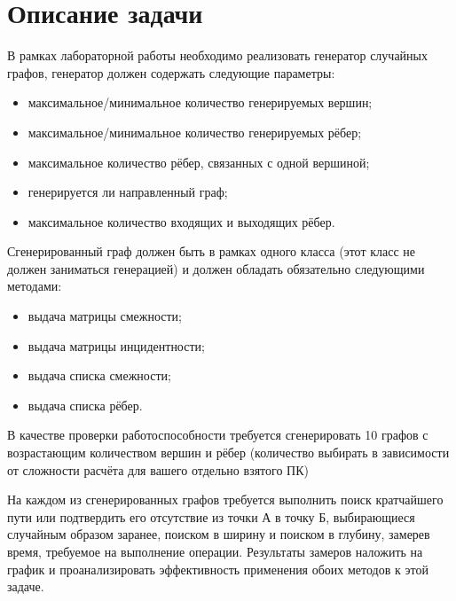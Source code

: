\documentclass[12pt, a4paper]{report}
\begin{document}
	\section*{Описание задачи}
	\large
	В рамках лабораторной работы необходимо реализовать генератор случайных графов, генератор должен содержать следующие параметры:
	\begin{itemize}
		\item максимальное/минимальное количество генерируемых вершин;
		\item максимальное/минимальное количество генерируемых рёбер;
		\item максимальное количество рёбер, связанных с одной вершиной;
		\item генерируется ли направленный граф;
		\item максимальное количество входящих и выходящих рёбер.
	\end{itemize}
	\par
	Сгенерированный граф должен быть в рамках одного класса (этот класс не должен заниматься генерацией) и должен обладать обязательно следующими методами:
	\begin{itemize}
		\item выдача матрицы смежности;
		\item выдача матрицы инцидентности;
		\item выдача списка смежности;
		\item выдача списка рёбер.
	\end{itemize}
	\par
	В качестве проверки работоспособности требуется сгенерировать 10 графов с возрастающим количеством вершин и рёбер (количество выбирать в зависимости от сложности расчёта для вашего отдельно взятого ПК)
	\par
	На каждом из сгенерированных графов требуется выполнить поиск кратчайшего пути или подтвердить его отсутствие из точки А в точку Б, выбирающиеся случайным образом заранее, поиском в ширину и поиском в глубину, замерев время, требуемое на выполнение операции. Результаты замеров наложить на график и проанализировать эффективность применения обоих методов к этой задаче.
	
	\newpage
\end{document}
